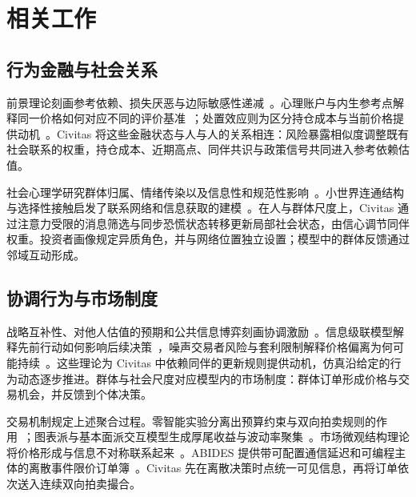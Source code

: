 \section{相关工作}
\label{sec:related}

\subsection{行为金融与社会关系}

前景理论刻画参考依赖、损失厌恶与边际敏感性递减~\cite{kahneman1979prospect,tversky1992advances}。心理账户与内生参考点解释同一价格如何对应不同的评价基准~\cite{thaler1985mental,koszegi2006model}；处置效应则为区分持仓成本与当前价格提供动机~\cite{shefrin1985disposition,odean1998reluctant}。Civitas 将这些金融状态与人与人的关系相连：风险暴露相似度调整既有社会联系的权重，持仓成本、近期高点、同伴共识与政策信号共同进入参考依赖估值。

社会心理学研究群体归属、情绪传染以及信息性和规范性影响~\cite{tajfel1979integrative,hatfield1993emotional,deutsch1955study}。小世界连通结构与选择性接触启发了联系网络和信息获取的建模~\cite{watts1998collective,sunstein2001republic}。在人与群体尺度上，Civitas 通过注意力受限的消息筛选与同步恐慌状态转移更新局部社会状态，由信心调节同伴权重。投资者画像规定异质角色，并与网络位置独立设置；模型中的群体反馈通过邻域互动形成。

\subsection{协调行为与市场制度}

战略互补性、对他人估值的预期和公共信息博弈刻画协调激励~\cite{cooper1988coordinating,keynes1936general,morris2002social}。信息级联模型解释先前行动如何影响后续决策~\cite{bikhchandani1992theory,banerjee1992simple}，噪声交易者风险与套利限制解释价格偏离为何可能持续~\cite{delong1990noise,shleifer1997limits}。这些理论为 Civitas 中依赖同伴的更新规则提供动机，仿真沿给定的行为动态逐步推进。群体与社会尺度对应模型内的市场制度：群体订单形成价格与交易机会，并反馈到个体决策。

交易机制规定上述聚合过程。零智能实验分离出预算约束与双向拍卖规则的作用~\cite{gode1993allocative}；图表派与基本面派交互模型生成厚尾收益与波动率聚集~\cite{lux1999scaling,lux2000volatility,raberto2001agent}。市场微观结构理论将价格形成与信息不对称联系起来~\cite{kyle1985continuous,glosten1985bid}。ABIDES 提供带可配置通信延迟和可编程主体的离散事件限价订单簿~\cite{abides2020}。Civitas 先在离散决策时点统一可见信息，再将订单依次送入连续双向拍卖撮合。

